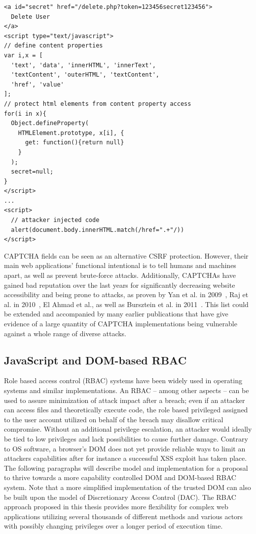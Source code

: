 \begin{lstlisting}[captionpos=b,label=lst:csrf-protect-via-js,caption=Example implementation of a JS based CSRF protection token shielding]
<a id="secret" href="/delete.php?token=123456secret123456">
  Delete User
</a>
<script type="text/javascript">
// define content properties
var i,x = [
  'text', 'data', 'innerHTML', 'innerText', 
  'textContent', 'outerHTML', 'textContent', 
  'href', 'value'
];
// protect html elements from content property access
for(i in x){
  Object.defineProperty(
    HTMLElement.prototype, x[i], {
      get: function(){return null}
    }
  );
  secret=null;
}
</script>
...
<script>
  // attacker injected code
  alert(document.body.innerHTML.match(/href=".+"/))
</script>
\end{lstlisting}

       CAPTCHA fields can be seen as an alternative CSRF protection. However, their main web applications' functional intentional is to tell humans and machines apart, as well as prevent brute-force attacks. Additionally, CAPTCHAs have gained bad reputation over the last years for significantly decreasing website accessibility and being prone to attacks, as proven by Yan et al. in 2009~\cite{yan2009captcha}, Raj et al. in 2010~\cite{raj2010picture}, El Ahmad et al., as well as Bursztein et al. in 2011~\cite{el2011robustness,Bursztein:2011:TCS:2046707.2046724}. This list could be extended and accompanied by many earlier publications that have give evidence of a large quantity of CAPTCHA implementations being vulnerable against a whole range of diverse attacks.

    \subsection{JavaScript and DOM-based RBAC}
    \label{subsubsec:6.6.3.javascript_and_dom_based_rbac}

    Role based access control (RBAC) systems have been widely used in operating systems and similar implementations. An RBAC -- among other aspects -- can be used to assure minimization of attack impact after a breach; even if an attacker can access files and theoretically execute code, the role based privileged assigned to the user account utilized on behalf of the breach may disallow critical compromise. Without an additional privilege escalation, an attacker would ideally be tied to low privileges and lack possibilities to cause further damage. Contrary to OS software, a browser's DOM does not yet provide reliable ways to limit an attackers capabilities after for instance a successful XSS exploit has taken place. The following paragraphs will describe model and implementation for a proposal to thrive towards a more capability controlled DOM and DOM-based RBAC system. Note that a more simplified implementation of the trusted DOM can also be built upon the model of Discretionary Access Control (DAC). The RBAC approach proposed in this thesis provides more flexibility for complex web applications utilizing several thousands of different methods and various actors with possibly changing privileges over a longer period of execution time.\\

